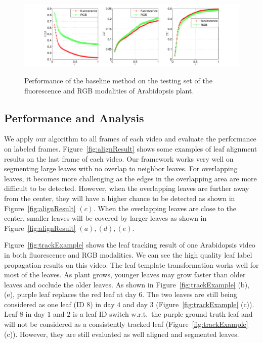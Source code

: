 \begin{figure}
\centering
\includegraphics[trim= 10 0 0 10, clip, width=.81\textwidth]{Figures/performance_fmp_rgb.pdf}\\
\caption{Performance of the baseline method on the testing set of the fluorescence and RGB modalities of Arabidopsis plant.}
\label{fig:performance}
\end{figure}


\subsection{Performance and Analysis}
We apply our algorithm to all frames of each video and evaluate the performance on labeled frames.
Figure~\ref{fig:alignResult} shows some examples of leaf alignment results on the last frame of each video. 
Our framework works very well on segmenting large leaves with no overlap to neighbor leaves.
For overlapping leaves, it becomes more challenging as the edges in the overlapping area are more difficult to be detected.
However, when the overlapping leaves are further away from the center, they will have a higher chance to be detected as shown in Figure~\ref{fig:alignResult} $(c)$.
When the overlapping leaves are close to the center, smaller leaves will be covered by larger leaves as shown in Figure~\ref{fig:alignResult} $(a), (d), (e)$.

Figure~\ref{fig:trackExample} shows the leaf tracking result of one Arabidopsis video in both fluorescence and RGB modalities. 
We can see the high quality leaf label propagation results on this video. 
The leaf template transformation works well for most of the leaves.
As plant grows, younger leaves may grow faster than older leaves and occlude the older leaves.
As shown in Figure~\ref{fig:trackExample} (b),(e), purple leaf replaces the red leaf at day $6$.
The two leaves are still being considered as one leaf (ID $8$) in day $4$ and day $3$ (Figure~\ref{fig:trackExample} (c)).
Leaf $8$ in day $1$ and $2$ is a leaf ID switch w.r.t.~the purple ground truth leaf and will not be considered as a consistently tracked leaf (Figure~\ref{fig:trackExample} (c)).
However, they are still evaluated as well aligned and segmented leaves.

